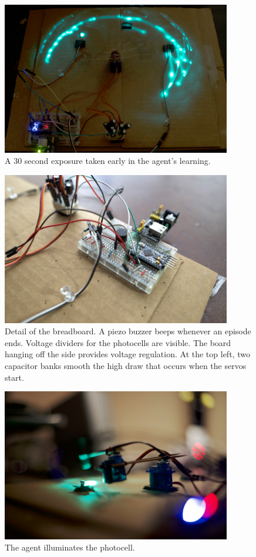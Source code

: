 \documentclass{article}
\begin{document}
	\begin{figure}[!htb]
		\centering
		\includegraphics[width=10cm]{../photos/long_shutter_small.jpg}
		\caption{A 30 second exposure taken early in the agent's learning.}
		\label{fig:long_shutter}
	\end{figure}
	
	\begin{figure}[!htb]
		\centering
		\includegraphics[width=10cm]{../photos/breadboard_small.jpg}
		\caption{Detail of the breadboard. A piezo buzzer beeps whenever an episode ends. Voltage dividers for the photocells are visible. The board hanging off the side provides voltage regulation. At the top left, two capacitor banks smooth the high draw that occurs when the servos start. }
		\label{fig:breadboard}
	\end{figure}
	
	\begin{figure}[!htb]
		\centering
		\includegraphics[width=10cm]{../photos/action_detail_small.jpg}
		\caption{The agent illuminates the photocell.}
		\label{fig:action}
	\end{figure}
\end{document}
